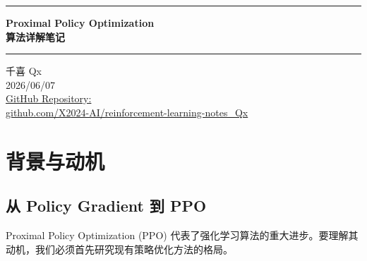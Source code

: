 \documentclass[12pt,a4paper]{article}
\theoremstyle{noteplain}
\theoremstyle{noteexercise}
\begin{document}
\thispagestyle{empty}

\vspace*{1cm}

\begin{center}
  \parbox{0.9\textwidth}{
    \centering
    \rule[6pt]{0.9\textwidth}{2pt}
    \vspace{0.3cm}
    {\LARGE\bfseries\color{deepblue} Proximal Policy Optimization \\[0.4em] 算法详解笔记}
    \vspace{0.3cm}
    \rule[6pt]{0.9\textwidth}{2pt}
  }
\end{center}

\vspace{0.8cm}

\begin{center}
  \begin{minipage}{0.7\textwidth}
    \centering
    \large\rmfamily\color{authorred}
    千喜 Qx \\[0.6em]
    \normalsize\rmfamily\color{darkgray} 2026/06/07 \\[0.4em]
    \normalsize\rmfamily\color{lightblue} \href{https://github.com/X2024-AI/reinforcement-learning-notes_Qx}{GitHub Repository:\\github.com/X2024-AI/reinforcement-learning-notes\_Qx}
  \end{minipage}
\end{center}

\vspace{1cm}

\tableofcontents

\newpage
{}
\pagestyle{fancy}

\section{背景与动机}\label{sec:bg}

\subsection{从 Policy Gradient 到 PPO}

Proximal Policy Optimization (PPO) 代表了强化学习算法的重大进步。要理解其动机，我们必须首先研究现有策略优化方法的格局。
\end{document}
